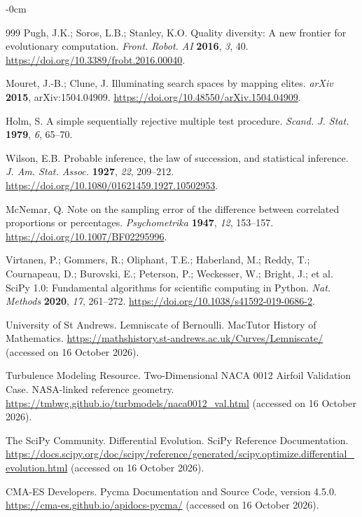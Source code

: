 \documentclass[applsci,article,submit,pdftex,moreauthors]{Definitions/mdpi}
\begin{document}
\begin{adjustwidth}{-\extralength}{0cm}
\begin{thebibliography}{999}
Pugh, J.K.; Soros, L.B.; Stanley, K.O. Quality diversity: A new
frontier for evolutionary computation. \textit{Front. Robot. AI}
\textbf{2016}, \textit{3}, 40.
\url{https://doi.org/10.3389/frobt.2016.00040}.

Mouret, J.-B.; Clune, J. Illuminating search spaces by mapping
elites. \textit{arXiv} \textbf{2015}, arXiv:1504.04909.
\url{https://doi.org/10.48550/arXiv.1504.04909}.

Holm, S. A simple sequentially rejective multiple test procedure.
\textit{Scand. J. Stat.} \textbf{1979}, \textit{6}, 65--70.

Wilson, E.B. Probable inference, the law of succession, and statistical
inference. \textit{J. Am. Stat. Assoc.} \textbf{1927}, \textit{22},
209--212. \url{https://doi.org/10.1080/01621459.1927.10502953}.

McNemar, Q. Note on the sampling error of the difference between
correlated proportions or percentages. \textit{Psychometrika}
\textbf{1947}, \textit{12}, 153--157.
\url{https://doi.org/10.1007/BF02295996}.

Virtanen, P.; Gommers, R.; Oliphant, T.E.; Haberland, M.; Reddy, T.;
Cournapeau, D.; Burovski, E.; Peterson, P.; Weckesser, W.; Bright,
J.; et al. SciPy 1.0: Fundamental algorithms for scientific computing
in Python. \textit{Nat. Methods} \textbf{2020}, \textit{17},
261--272. \url{https://doi.org/10.1038/s41592-019-0686-2}.

 University of St Andrews. Lemniscate of Bernoulli. MacTutor History of Mathematics. \url{https://mathshistory.st-andrews.ac.uk/Curves/Lemniscate/} (accessed on 16 October 2026).

 Turbulence Modeling Resource. Two-Dimensional NACA 0012 Airfoil Validation Case. NASA-linked reference geometry. \url{https://tmbwg.github.io/turbmodels/naca0012_val.html} (accessed on 16 October 2026).

 The SciPy Community. Differential Evolution. SciPy Reference Documentation. \url{https://docs.scipy.org/doc/scipy/reference/generated/scipy.optimize.differential_evolution.html} (accessed on 16 October 2026).

 CMA-ES Developers. Pycma Documentation and Source Code, version 4.5.0. \url{https://cma-es.github.io/apidocs-pycma/} (accessed on 16 October 2026).


\end{thebibliography}

\PublishersNote{}
\end{adjustwidth}
\end{document}

